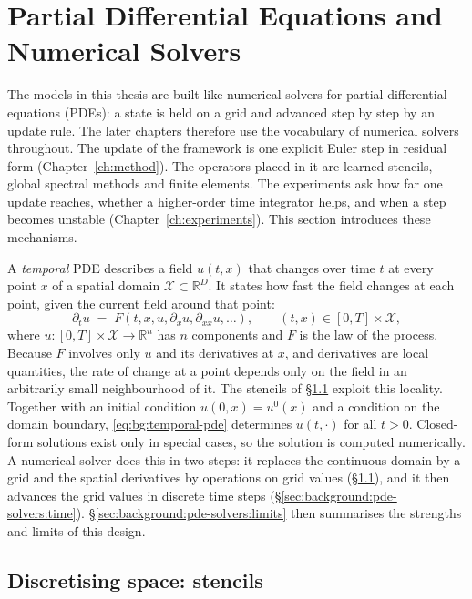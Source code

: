 \section{Partial Differential Equations and Numerical Solvers}
\label{sec:background:pde-solvers}
The models in this thesis are built like numerical solvers for partial
differential equations (PDEs): a state is held on a grid and advanced
step by step by an update rule. The later
chapters therefore use the vocabulary of numerical solvers throughout.
The update of the framework is one explicit Euler step in residual form
(Chapter~\ref{ch:method}). The operators placed in it are learned
stencils, global spectral methods and finite elements. The experiments
ask how far one update reaches, whether a higher-order time integrator
helps, and when a step becomes unstable (Chapter~\ref{ch:experiments}).
This section introduces these mechanisms.

A \emph{temporal} PDE describes a field $u(t, x)$ that changes over time
$t$ at every point $x$ of a spatial domain $\mathcal{X} \subset
\mathbb{R}^D$. It states how fast the field changes at each point, given
the current field around that point:
\begin{equation}
  \partial_t u \;=\; F\!\left(t, x, u, \partial_x u, \partial_{xx} u, \dots\right),
  \qquad (t, x) \in [0, T] \times \mathcal{X},
  \label{eq:bg:temporal-pde}
\end{equation}
where $u: [0, T] \times \mathcal{X} \to \mathbb{R}^n$ has $n$ components
and $F$ is the law of the process. Because $F$ involves only $u$ and
its derivatives at $x$, and derivatives are local quantities, the rate
of change at a point depends only on the field in an arbitrarily small
neighbourhood of it. The stencils of
\S\ref{sec:background:pde-solvers:stencils} exploit this locality. Together with an
initial condition $u(0, x) = u^{0}(x)$ and a condition on the domain
boundary, \eqref{eq:bg:temporal-pde} determines $u(t, \cdot)$ for all
$t > 0$. Closed-form solutions exist only in special cases, so the
solution is computed numerically. A numerical solver does this in two
steps: it replaces the continuous domain by a grid and the spatial
derivatives by operations on grid values
(\S\ref{sec:background:pde-solvers:stencils}), and it then advances the
grid values in discrete time steps
(\S\ref{sec:background:pde-solvers:time}).
\S\ref{sec:background:pde-solvers:limits} then summarises the strengths
and limits of this design.

\subsection{Discretising space: stencils}
\label{sec:background:pde-solvers:stencils}

